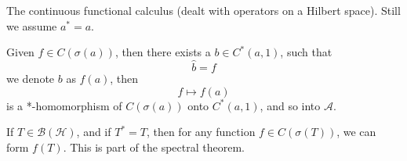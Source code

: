 The continuous functional calculus (dealt with operators on a Hilbert space). Still we assume $a^*=a$.

Given $f\in C(\sigma(a))$, then there exists a $b\in C^*(a, 1)$, such that 
\begin{equation*}
    \widehat{b}=f
\end{equation*}
we denote $b$ as $f(a)$, then 
\begin{equation*}
    f\mapsto f(a)
\end{equation*}
is a *-homomorphism of $C(\sigma(a))$ onto $C^*(a, 1)$, and so into $\mathcal{A}$.

\begin{corollary}
    If $T\in\mathcal{B}(\mathcal{H})$, and if $T^*=T$, then for any function $f\in C(\sigma(T))$, we can form $f(T)$. This is part of the spectral theorem.
\end{corollary}

